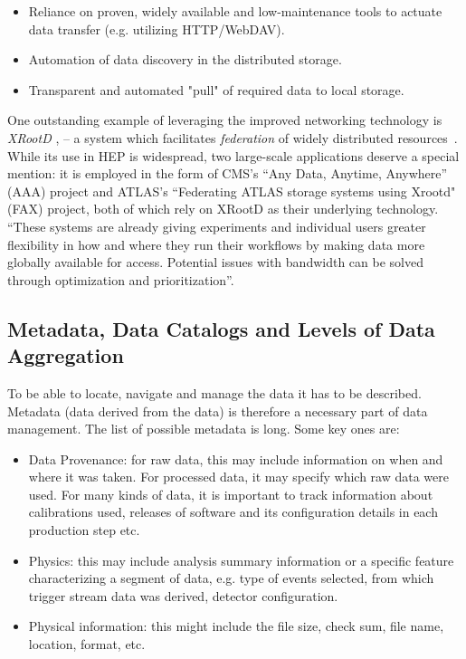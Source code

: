 \begin{itemize}
	\item Reliance on proven, widely available and low-maintenance tools to actuate data transfer (e.g. utilizing HTTP/WebDAV).
	\item Automation of data discovery in the distributed storage.
	\item Transparent and automated "pull" of required data to local storage.
\end{itemize}

One outstanding example of leveraging the improved networking technology is \textit{XRootD}
\cite{xrootd}, \cite{xrootd_web} -- a system which facilitates \textit{federation} of widely 
distributed resources~\cite{xrootd_fed,xrootd_snowmass}. While its use in HEP is widespread, two large-scale applications deserve a special mention: 
it is employed  in the form of CMS's ``Any Data, Anytime, Anywhere'' (AAA)
project and ATLAS's ``Federating ATLAS storage systems using Xrootd" (FAX) project, both of which rely
on XRootD as their underlying technology. ``These systems are already giving experiments and
individual users greater flexibility in how and where they run their workflows by making data more globally
available for access. Potential issues with bandwidth can be solved through optimization and prioritization''\cite{xrootd_snowmass}.


\subsection{Metadata, Data Catalogs and Levels of Data Aggregation}
To be able to locate, navigate and manage the data it has to be described. Metadata (data derived from the data) is therefore a necessary
part of data management. The  list of possible metadata is long. Some key ones are:

\begin{itemize}
\item Data Provenance: for raw data, this may include information on when and where it was taken. For processed data,
it may specify which raw data were used. For many kinds of data, it is important to track information about calibrations used,
releases of software and its configuration details in each production step etc.

\item Physics: this may include analysis summary information or a specific feature characterizing a segment of data, e.g. type of events selected, from which trigger stream data was derived, detector configuration.
\item Physical information: this might include the file size, check sum, file name, location, format, etc.
\end{itemize}

